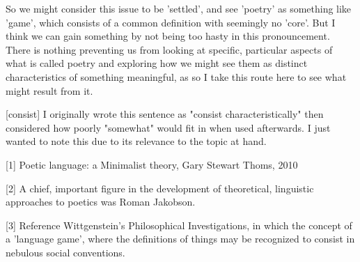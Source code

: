 \documentclass[]{article}
\begin{document}
So we might consider this issue to be 'settled', and see 'poetry' as something like 'game', which consists of a common definition with seemingly no 'core'. But I think we can gain something by not being too hasty in this pronouncement. There is nothing preventing us from looking at specific, particular aspects of what is called poetry and exploring how we might see them as distinct characteristics of something meaningful, as so I take this route here to see what might result from it.



[consist] I originally wrote this sentence as "consist characteristically" then considered how poorly "somewhat" would fit in when used afterwards. I just wanted to note this due to its relevance to the topic at hand.



[1] Poetic language: a Minimalist theory,  Gary Stewart Thoms, 2010

[2] A chief, important figure in the development of theoretical, linguistic approaches to poetics was Roman Jakobson.

[3] Reference Wittgenstein's Philosophical Investigations, in which the concept of a 'language game', where the definitions of things may be recognized to consist in nebulous social conventions.
\end{document}
